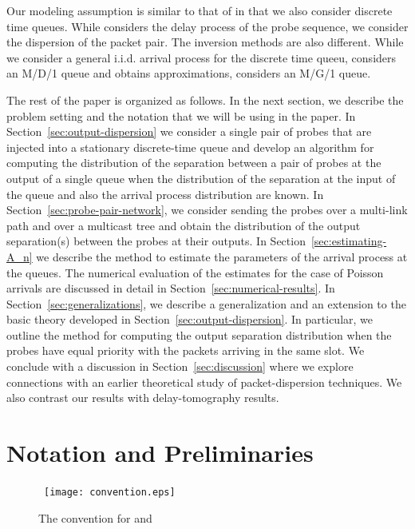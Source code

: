 \documentclass[11pt]{article}
\begin{document}
Our modeling assumption is similar to that of \cite{Machiraju07} in
that we also consider discrete time queues. While \cite{Machiraju07}
considers the delay process of the probe sequence, we consider the
dispersion of the packet pair. The inversion methods are also
different. While we consider a general i.i.d. arrival process for the
discrete time queeu, \cite{Park06} considers an M/D/1 queue and
obtains approximations, \cite{Haga06} considers an M/G/1 queue. 

The rest of the paper is organized as follows. In the next section, we
describe the problem setting and the notation that we will be using in
the paper. In Section~\ref{sec:output-dispersion} we consider a single
pair of probes that are injected into a stationary discrete-time queue
and develop an algorithm for computing the distribution of the
separation between a pair of probes at the output of a single queue
when the distribution of the separation at the input of the queue and
also the arrival process distribution are known. In
Section~\ref{sec:probe-pair-network}, we consider sending the probes
over a multi-link path and over a multicast tree and obtain the
distribution of the output separation(s) between the probes at their
outputs.  In Section~\ref{sec:estimating-A_n} we describe the method
to estimate the parameters of the arrival process at the queues. The
numerical evaluation of the estimates for the case of Poisson arrivals
are discussed in detail in Section~\ref{sec:numerical-results}. In
Section~\ref{sec:generalizations}, we describe a generalization and an
extension to the basic theory developed in
Section~\ref{sec:output-dispersion}. In particular, we outline the
method for computing the output separation distribution when the
probes have equal priority with the packets arriving in the same slot.
We conclude with a discussion in Section~\ref{sec:discussion} where we
explore connections with an earlier theoretical study of
packet-dispersion techniques. We also contrast our results with
delay-tomography results.

\section{Notation and Preliminaries}
\label{sec:notation}
\begin{figure}
  \begin{center}
    \     
    \texttt{[image: convention.eps]}
  \end{center}

  \caption{The convention for   and }
    \label{fig:convention}
\end{figure}
\end{document}
